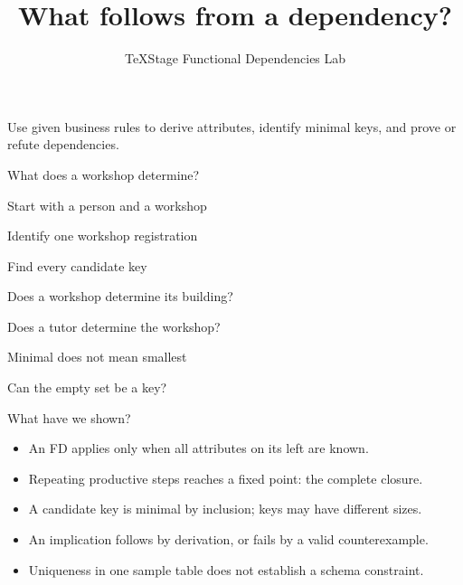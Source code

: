 \documentclass[aspectratio=169]{beamer}
\title{What follows from a dependency?}
\author{TeXStage Functional Dependencies Lab}
\date{}
\begin{document}
\begin{frame}\titlepage
\small Use given business rules to derive attributes, identify minimal keys, and prove or refute dependencies.
\end{frame}
\begin{frame}{What does a workshop determine?}
\end{frame}
\begin{frame}{Start with a person and a workshop}
\end{frame}
\begin{frame}{Identify one workshop registration}
\end{frame}
\begin{frame}{Find every candidate key}
\end{frame}
\begin{frame}{Does a workshop determine its building?}
\end{frame}
\begin{frame}{Does a tutor determine the workshop?}
\end{frame}
\begin{frame}{Minimal does not mean smallest}
\end{frame}
\begin{frame}{Can the empty set be a key?}
\end{frame}
\begin{frame}{What have we shown?}
\begin{itemize}
\item An FD applies only when all attributes on its left are known.
\item Repeating productive steps reaches a fixed point: the complete closure.
\item A candidate key is minimal by inclusion; keys may have different sizes.
\item An implication follows by derivation, or fails by a valid counterexample.
\item Uniqueness in one sample table does not establish a schema constraint.
\end{itemize}
\end{frame}
\end{document}
